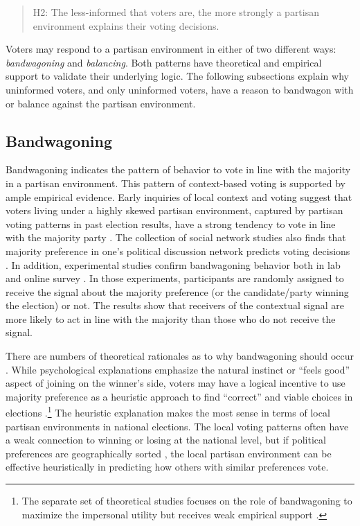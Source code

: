 \documentclass[letterpaper, 12pt]{article}
\begin{document}
    \begin{verse}
        H2: The less-informed that voters are, the more strongly a partisan environment explains their voting decisions. 
    \end{verse}

    \noindent Voters may respond to a partisan environment in either of two different ways: \textit{bandwagoning} and \textit{balancing}. Both patterns have theoretical and empirical support to validate their underlying logic. The following subsections explain why uninformed voters, and only uninformed voters, have a reason to bandwagon with or balance against the partisan environment.

    \subsection*{Bandwagoning}

    \par Bandwagoning indicates the pattern of behavior to vote in line with the majority in a partisan environment. This pattern of context-based voting is supported by ample empirical evidence. Early inquiries of local context and voting suggest that voters living under a highly skewed partisan environment, captured by partisan voting patterns in past election results, have a strong tendency to vote in line with the majority party \citep{Miller1956onpo, Putnam1966poat}. The collection of social network studies also finds that majority preference in one's political discussion network predicts voting decisions \citep{Huckfeldt1987nein, Huckfeldt1995cipo, Huckfeldt2014nobi}. In addition, experimental studies confirm bandwagoning behavior both in lab \citep{Bischoff2013soin, Morton2015whmo, Tyran2016exev} and online survey \citep{Roy2015anex,vanderMeer2016ofth, Dahlgaard2017hoel}. In those experiments, participants are randomly assigned to receive the signal about the majority preference (or the candidate/party winning the election) or not. The results show that receivers of the contextual signal are more likely to act in line with the majority than those who do not receive the signal.

    \par There are numbers of theoretical rationales as to why bandwagoning should occur \citep{Hardmeier2008thef}. While psychological explanations emphasize the natural instinct or ``feels good'' aspect of joining on the winner's side, voters may have a logical incentive to use majority preference as a heuristic approach to find ``correct'' and viable choices in elections \citep{Chaiken1987thhe, Lau2001adan}.\footnote{The separate set of theoretical studies focuses on the role of bandwagoning to maximize the impersonal utility \citep{Coate2004grru, Feddersen2006thca,Feddersen2006thof} but receives weak empirical support \citep{Morton2015whmo}.} The heuristic explanation makes the most sense in terms of local partisan environments in national elections. The local voting patterns often have a weak connection to winning or losing at the national level, but if political preferences are geographically sorted \citep{TamCho2013vomi}, the local partisan environment can be effective heuristically in predicting how others with similar preferences vote.
\end{document}
